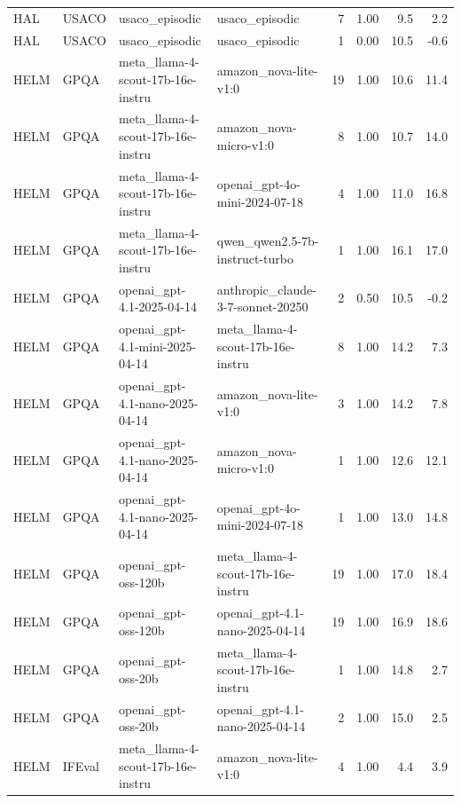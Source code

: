 \begin{longtable}{lp{2.4cm}p{3.5cm}p{3.5cm}rrrr}
HAL & USACO & usaco\_\allowbreak episodic & usaco\_\allowbreak episodic & 7 & 1.00 & 9.5 & 2.2 \\
HAL & USACO & usaco\_\allowbreak episodic & usaco\_\allowbreak episodic & 1 & 0.00 & 10.5 & -0.6 \\
HELM & GPQA & meta\_\allowbreak llama-4-scout-17b-16e-instru~ & amazon\_\allowbreak nova-lite-v1:0 & 19 & 1.00 & 10.6 & 11.4 \\
HELM & GPQA & meta\_\allowbreak llama-4-scout-17b-16e-instru~ & amazon\_\allowbreak nova-micro-v1:0 & 8 & 1.00 & 10.7 & 14.0 \\
HELM & GPQA & meta\_\allowbreak llama-4-scout-17b-16e-instru~ & openai\_\allowbreak gpt-4o-mini-2024-07-18 & 4 & 1.00 & 11.0 & 16.8 \\
HELM & GPQA & meta\_\allowbreak llama-4-scout-17b-16e-instru~ & qwen\_\allowbreak qwen2.5-7b-instruct-turbo & 1 & 1.00 & 16.1 & 17.0 \\
HELM & GPQA & openai\_\allowbreak gpt-4.1-2025-04-14 & anthropic\_\allowbreak claude-3-7-sonnet-20250~ & 2 & 0.50 & 10.5 & -0.2 \\
HELM & GPQA & openai\_\allowbreak gpt-4.1-mini-2025-04-14 & meta\_\allowbreak llama-4-scout-17b-16e-instru~ & 8 & 1.00 & 14.2 & 7.3 \\
HELM & GPQA & openai\_\allowbreak gpt-4.1-nano-2025-04-14 & amazon\_\allowbreak nova-lite-v1:0 & 3 & 1.00 & 14.2 & 7.8 \\
HELM & GPQA & openai\_\allowbreak gpt-4.1-nano-2025-04-14 & amazon\_\allowbreak nova-micro-v1:0 & 1 & 1.00 & 12.6 & 12.1 \\
HELM & GPQA & openai\_\allowbreak gpt-4.1-nano-2025-04-14 & openai\_\allowbreak gpt-4o-mini-2024-07-18 & 1 & 1.00 & 13.0 & 14.8 \\
HELM & GPQA & openai\_\allowbreak gpt-oss-120b & meta\_\allowbreak llama-4-scout-17b-16e-instru~ & 19 & 1.00 & 17.0 & 18.4 \\
HELM & GPQA & openai\_\allowbreak gpt-oss-120b & openai\_\allowbreak gpt-4.1-nano-2025-04-14 & 19 & 1.00 & 16.9 & 18.6 \\
HELM & GPQA & openai\_\allowbreak gpt-oss-20b & meta\_\allowbreak llama-4-scout-17b-16e-instru~ & 1 & 1.00 & 14.8 & 2.7 \\
HELM & GPQA & openai\_\allowbreak gpt-oss-20b & openai\_\allowbreak gpt-4.1-nano-2025-04-14 & 2 & 1.00 & 15.0 & 2.5 \\
HELM & IFEval & meta\_\allowbreak llama-4-scout-17b-16e-instru~ & amazon\_\allowbreak nova-lite-v1:0 & 4 & 1.00 & 4.4 & 3.9 \\

\end{longtable}
